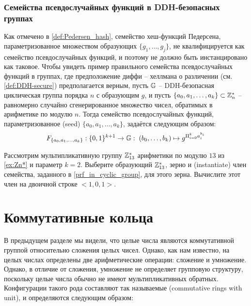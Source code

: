 \subsubsection{Семейства псевдослучайных функций в DDH-безопасных группах}
Как отмечено в \ref{def:Pedersen_hash}, семейство хеш-функций Педерсена, параметризованное множеством образующих $\{g_1,\ldots,g_j\}$, не квалифицируется как семейство псевдослучайных функций, и поэтому не должно быть инстанцировано как таковое. Чтобы увидеть пример правильного семейства псевдослучайных функций в группах, где предположение диффи -- хеллмана о различении (см. \secname \ref{def:DDH-secure}) предполагается верным, пусть $\mathbb{G}$ -- DDH-безопасная циклическая группа порядка $n$ с образующим $g$, и пусть $\{a_0,a_1,\ldots,a_k\}\subset \mathbb{Z}_{n}^*$ -- равномерно случайно сгенерированное множество чисел, обратимых в арифметике по модулю $n$. Тогда семейство псевдослучайных функций, параметризованное  (seed) $\{a_0,a_1,\ldots,a_k\}$, задаётся следующим образом:
\begin{equation}
\label{prf_in_cyclic_group}
F_{\{a_0,a_1,\ldots,a_k\}}: \{0,1\}^{k+1} \to \mathbb{G}:\; (b_0,\ldots,b_k)\mapsto g^{\Pi_{i=0}^k a_i^{b_i}}
\end{equation}
\begin{exercise} Рассмотрим мультипликативную группу $\mathbb{Z}_{13}^*$ арифметики по модулю $13$ из \examplename{} \ref{ex:Zn*} и параметр $k=2$. Выберите образующий $\mathbb{Z}_{13}^*$, зерно и  (instantiate) член семейства, заданного в \eqref{prf_in_cyclic_group}, для этого зерна. Вычислите этот член на двоичной строке $<1,0,1>$.
\end{exercise}

\section{Коммутативные кольца}\label{sec:rings}
В предыдущем разделе мы видели, что целые числа являются коммутативной группой относительно сложения целых чисел. Однако, как нам известно, на целых числах определены две арифметические операции: сложение и умножение. Однако, в отличие от сложения, умножение не определяет групповую структуру, поскольку целые числа обычно не имеют мультипликативных обратных. Конфигурации такого рода составляют так называемые  (commutative rings with unit), и определяются следующим образом:

